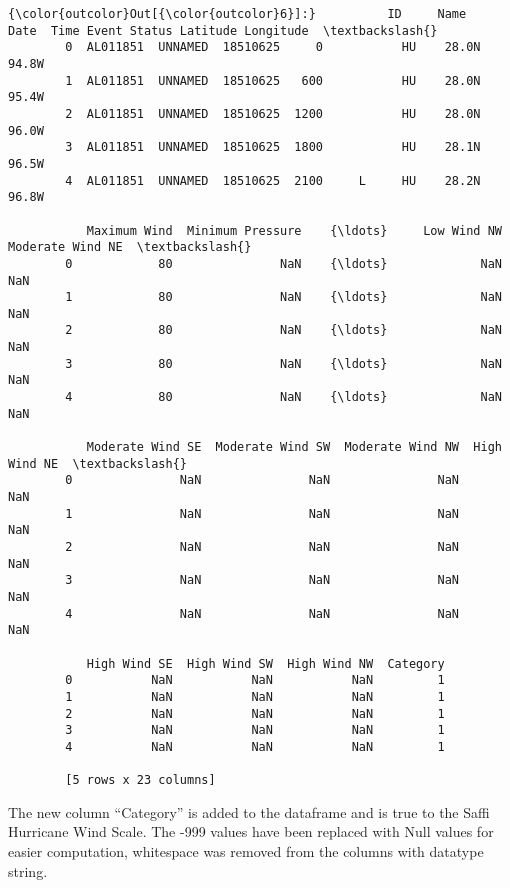 \documentclass[11pt]{article}
\begin{document}
\begin{Verbatim}[commandchars=\\\{\}]
{\color{outcolor}Out[{\color{outcolor}6}]:}          ID     Name      Date  Time Event Status Latitude Longitude  \textbackslash{}
        0  AL011851  UNNAMED  18510625     0           HU    28.0N     94.8W   
        1  AL011851  UNNAMED  18510625   600           HU    28.0N     95.4W   
        2  AL011851  UNNAMED  18510625  1200           HU    28.0N     96.0W   
        3  AL011851  UNNAMED  18510625  1800           HU    28.1N     96.5W   
        4  AL011851  UNNAMED  18510625  2100     L     HU    28.2N     96.8W   
        
           Maximum Wind  Minimum Pressure    {\ldots}     Low Wind NW  Moderate Wind NE  \textbackslash{}
        0            80               NaN    {\ldots}             NaN               NaN   
        1            80               NaN    {\ldots}             NaN               NaN   
        2            80               NaN    {\ldots}             NaN               NaN   
        3            80               NaN    {\ldots}             NaN               NaN   
        4            80               NaN    {\ldots}             NaN               NaN   
        
           Moderate Wind SE  Moderate Wind SW  Moderate Wind NW  High Wind NE  \textbackslash{}
        0               NaN               NaN               NaN           NaN   
        1               NaN               NaN               NaN           NaN   
        2               NaN               NaN               NaN           NaN   
        3               NaN               NaN               NaN           NaN   
        4               NaN               NaN               NaN           NaN   
        
           High Wind SE  High Wind SW  High Wind NW  Category  
        0           NaN           NaN           NaN         1  
        1           NaN           NaN           NaN         1  
        2           NaN           NaN           NaN         1  
        3           NaN           NaN           NaN         1  
        4           NaN           NaN           NaN         1  
        
        [5 rows x 23 columns]
\end{Verbatim}
            
    The new column ``Category'' is added to the dataframe and is true to the
Saffi Hurricane Wind Scale. The -999 values have been replaced with Null
values for easier computation, whitespace was removed from the columns
with datatype string.
\end{document}
